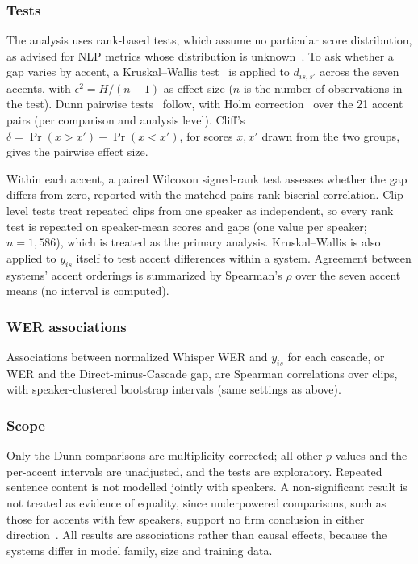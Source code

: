 \subsubsection{Tests}
The analysis uses rank-based tests, which assume no particular score distribution,
as advised for NLP metrics whose distribution is unknown~\cite{dror2018}.
To ask whether a gap varies by accent, a Kruskal--Wallis
test~\cite{kruskal1952} is applied to $d_{is,s'}$ across the seven accents,
with $\epsilon^2=H/(n-1)$ as effect size ($n$ is the number of observations
in the test). Dunn pairwise tests~\cite{dunn1964} follow, with Holm
correction~\cite{holm1979} over the 21 accent pairs (per comparison and
analysis level). Cliff's $\delta=\Pr(x>x')-\Pr(x<x')$, for scores $x,x'$
drawn from the two groups, gives the pairwise effect size.

Within each accent, a paired Wilcoxon signed-rank test assesses whether the
gap differs from zero, reported with the matched-pairs rank-biserial
correlation. Clip-level tests treat repeated clips from one speaker as
independent, so every rank test is repeated on speaker-mean scores and gaps
(one value per speaker; $n=1{,}586$), which is treated as the primary analysis.
Kruskal--Wallis is also applied to $y_{is}$ itself to test accent differences
within a system. Agreement between systems' accent orderings is summarized by
Spearman's $\rho$ over the seven accent means (no interval is computed).

\subsubsection{WER associations}
Associations between normalized Whisper WER and $y_{is}$ for each cascade, or WER and the Direct-minus-Cascade gap, are Spearman correlations over clips, with speaker-clustered bootstrap intervals (same settings as above).

\subsubsection{Scope}
Only the Dunn comparisons are multiplicity-corrected; all other $p$-values and the per-accent intervals are unadjusted, and the tests are exploratory. Repeated sentence content is not modelled jointly with speakers. A non-significant result is not treated as evidence of equality, since underpowered comparisons, such as those for accents with few speakers, support no firm conclusion in either direction~\cite{card2020power}. All results are associations rather than causal effects, because the systems differ in model family, size and training data.

